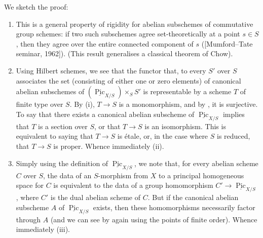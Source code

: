 \begin{cproof}
    We sketch the proof:
    \begin{enumerate}
        \item This is a general property of rigidity for abelian subschemes of commutative group schemes: if two such subschemes agree set-theoretically at a point $s\in S$, then they agree over the entire connected component of $s$ ([Mumford–Tate seminar, 1962]).
              (This result generalises a classical theorem of Chow).
        \item Using Hilbert schemes, we see that the functor that, to every $S'$ over $S$ associates the set (consisting of either one or zero elements) of canonical abelian subschemes of $(\underline{\operatorname{Pic}}_{X/S})\times_S S'$ is representable by a scheme $T$ of finite type over $S$.
              By (i), $T\to S$ is a monomorphism, and by , it is surjective.
              To say that there exists a canonical abelian subscheme of $\underline{\operatorname{Pic}}_{X/S}$ implies that $T$ is a section over $S$, or that $T\to S$ is an isomorphism.
              This is equivalent to saying that $T\to S$ is étale, or, in the case where $S$ is reduced, that $T\to S$ is proper.
              Whence immediately (ii).
        \item Simply using the definition of $\underline{\operatorname{Pic}}_{X/S}$, we note that, for every abelian scheme $C$ over $S$, the data of an $S$-morphism from $X$ to a principal homogeneous space for $C$ is equivalent to the data of a group homomorphism $C'\to\underline{\operatorname{Pic}}_{X/S}$, where $C'$ is the dual abelian scheme of $C$.
              But if the canonical abelian subscheme $A$ of $\underline{\operatorname{Pic}}_{X/S}$ exists, then these homomorphisms necessarily factor through $A$ (and we can see by again using the points of finite order).
              Whence immediately (iii).
    \end{enumerate}
\end{cproof}

